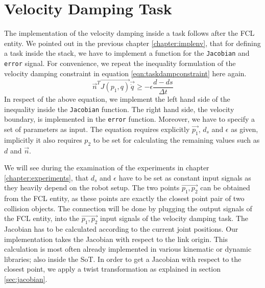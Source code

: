 \section{Velocity Damping Task}
The implementation of the velocity damping inside a task follows after the FCL entity. We pointed out in the previous chapter \ref{chapter:implenv}, that for defining a task inside the stack, we have to implement a function for the \texttt{Jacobian} and \texttt{error} signal. For convenience, we repeat the inequality formulation of the velocity damping constraint in equation \ref{eqn:taskdampconstraint} here again. 
\begin{equation}
\vec{n}^T\vec{J(p_1,q)} \vec{\dot{q}} \geq - \epsilon \frac{d - ds}{\Delta t}
\end{equation}
In respect of the above equation, we implement the left hand side of the inequality inside the \texttt{Jacobian} function. The right hand side, the velocity boundary, is implemented in the \texttt{error} function. Moreover, we have to specify a set of parameters as input. The equation requires explicitly $\vec{p_1}$, $d_s$ and $\epsilon$ as given, implicitly it also requires $p_2$ to be set for calculating the remaining values such as $d$ and $\vec{n}$.

We will see during the examination of the experiments in chapter \ref{chapter:experiments}, that $d_s$ and $\epsilon$ have to be set as constant input signals as they heavily depend on the robot setup. The two points $\vec{p_1, p_2}$ can be obtained from the FCL entity, as these points are exactly the closest point pair of two collision objects. The connection will be done by plugging the output signals of the FCL entity, into the $\vec{p_1, p_2}$ input signals of the velocity damping task. The Jacobian has to be calculated according to the current joint positions. Our implementation takes the Jacobian with respect to the link origin. This calculation is most often already implemented in various kinematic or dynamic libraries; also inside the SoT. In order to get a Jacobian with respect to the closest point, we apply a twist transformation as explained in section \ref{sec:jacobian}. 

